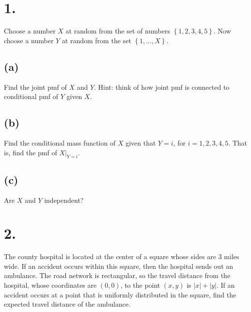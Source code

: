 \documentclass{article}
\begin{document}
\thispagestyle{firstpageheader}

\section*{1.}
{\Large 
Choose a number $X$ at random from the set of numbers
$\left\{ 1,2,3,4,5\right\} $. Now choose a number $Y$ at random
from the set $\left\{ 1,\dots,X\right\} $.

\subsection*{(a)}
Find the joint pmf of $X$ and $Y$. Hint: think of how  joint pmf  is connected to conditional pmf of $Y$ given $X$.

\subsection*{(b)}
Find the conditional mass function of $X$ given that $Y=i$,
for $i=1,2,3,4,5$. That is, find the pmf of $X|_{Y=i}$. 

\subsection*{(c)}
Are $X$ and $Y$ independent?

}

\section*{2.}
{\Large

The county hospital is located at the center of a square
whose sides are $3$ miles wide. If an accident occurs within this
square, then the hospital sends out an ambulance. The road network
is rectangular, so the travel distance from the hospital, whose coordinates
are $(0,0)$, to the point $(x,y)$ is $|x|+|y|$. If an accident
occurs at a point that is uniformly distributed in the square, find
the expected travel distance of the ambulance.

}
\end{document}
